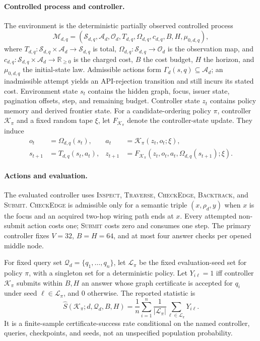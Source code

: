\documentclass{article}
\begin{document}
\paragraph{Controlled process and controller.}
The environment is the deterministic partially observed controlled process
\[
 \mathcal M_{d,q}=(\mathcal S_{d,q},\mathcal A_d,\mathcal O_d,
 T_{d,q},\Omega_{d,q},c_{d,q},B,H,\mu_{0,d,q}),
\]
where \(T_{d,q}:\mathcal S_{d,q}\times\mathcal A_d\to\mathcal S_{d,q}\) is total,
\(\Omega_{d,q}:\mathcal S_{d,q}\to\mathcal O_d\) is the observation map, and
\(c_{d,q}:\mathcal S_{d,q}\times\mathcal A_d\to\mathbb R_{\geq0}\) is the charged cost,
\(B\) the cost budget, \(H\) the horizon, and \(\mu_{0,d,q}\) the initial-state
law. Admissible actions form \(\Gamma_d(s,q)\subseteq\mathcal A_d\);
an inadmissible attempt yields an API-rejection transition and still incurs
its stated cost. Environment state \(s_t\) contains the hidden graph, focus,
issuer state, pagination offsets, step, and remaining budget. Controller state
\(z_t\) contains policy memory and derived frontier state. For a
candidate-ordering policy \(\pi\), controller \(\mathcal K_\pi\) and a fixed
random tape \(\xi\), let \(F_{\mathcal K_\pi}\) denote the controller-state update. They induce
\[
 \begin{aligned}
 o_t&=\Omega_{d,q}(s_t), & a_t&=\mathcal K_\pi(z_t,o_t;\xi),\\
 s_{t+1}&=T_{d,q}(s_t,a_t), &
 z_{t+1}&=F_{\mathcal K_\pi}(z_t,o_t,a_t,\Omega_{d,q}(s_{t+1});\xi).
 \end{aligned}
\]
\paragraph{Actions and evaluation.}
The evaluated controller uses \textsc{Inspect}, \textsc{Traverse},
\textsc{CheckEdge}, \textsc{Backtrack}, and \textsc{Submit}.
\textsc{CheckEdge} is admissible only for a semantic triple
\((x,\rho_d,y)\) when \(x\) is the focus and an acquired two-hop wiring path
ends at \(x\). Every attempted non-submit action costs one; \textsc{Submit}
costs zero and consumes one step. The primary controller fixes \(V=32\),
\(B=H=64\), and at most four answer checks per opened middle node.

For fixed query set \(\mathcal Q_d=\{q_1,\ldots,q_n\}\), let
$\mathcal L_\pi$ be the fixed evaluation-seed set for policy $\pi$, with a
singleton set for a deterministic policy. Let \(Y_{i\ell}=1\) iff controller
\(\mathcal K_\pi\) submits within \(B,H\) an answer whose graph certificate is
accepted for \(q_i\) under seed $\ell\in\mathcal L_\pi$, and \(0\) otherwise.
The reported statistic is
\[
 \widehat S(\mathcal K_\pi;d,\mathcal Q_d,B,H)=
 \frac1n\sum_{i=1}^{n}\frac1{|\mathcal L_\pi|}
 \sum_{\ell\in\mathcal L_\pi}Y_{i\ell}.
\]
It is a finite-sample certificate-success rate conditional on the named
controller, queries, checkpoints, and seeds, not an unspecified population
probability.
\end{document}
